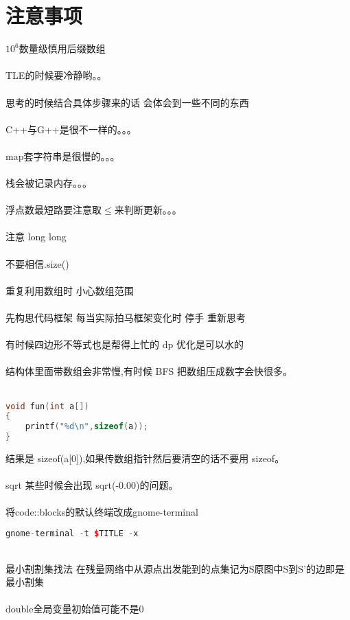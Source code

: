 \section{注意事项}
    $10^{6}$数量级慎用后缀数组\\
    \\
    TLE的时候要冷静哟。。\\
    \\
    思考的时候结合具体步骤来的话 会体会到一些不同的东西\\
    \\
    C++与G++是很不一样的。。。\\
    \\
    map套字符串是很慢的。。。\\ 
    \\
    栈会被记录内存。。。\\
    \\
    浮点数最短路要注意取$\leq$来判断更新。。。\\
    \\
    注意 long long\\
    \\
    不要相信.size()\\
    \\
    重复利用数组时 小心数组范围\\
    \\
    先构思代码框架 每当实际拍马框架变化时 停手 重新思考\\
    \\
    有时候四边形不等式也是帮得上忙的 dp 优化是可以水的\\
    \\
    结构体里面带数组会非常慢,有时候 BFS 把数组压成数字会快很多。\\
    \\
    \begin{lstlisting}[language=c++]
void fun(int a[])
{
    printf("%d\n",sizeof(a));
}
    \end{lstlisting}
    结果是 sizeof(a[0]),如果传数组指针然后要清空的话不要用 sizeof。\\
    \\
    sqrt 某些时候会出现 sqrt(-0.00)的问题。\\
    \\
    将code::blocks的默认终端改成gnome-terminal
    \begin{lstlisting}[language=c++]
gnome-terminal -t $TITLE -x
    \end{lstlisting}
    ~\\
    最小割割集找法 在残量网络中从源点出发能到的点集记为S原图中S到S’的边即是最小割集\\
    \\
    double全局变量初始值可能不是$0$\\
